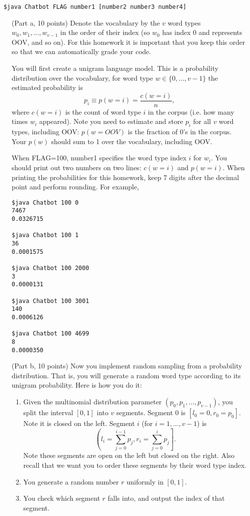 \documentclass{article}
\begin{document}
\texttt{
\$java Chatbot FLAG number1 [number2 number3 number4]
}


\begin{itemize}

\item[(Part a, 10 points)]
Denote the vocabulary by the $v$ word types $w_0, w_1, \ldots, w_{v-1}$ in the order of their index (so $w_0$ has index 0 and represents OOV, and so on). 
For this homework it is important that you keep this order so that we can automatically grade your code.

You will first create a unigram language model.
This is a probability distribution over the vocabulary, for word type $w \in \{0, \ldots, v-1\}$ the estimated probability is
$$p_i \equiv p(w=i) = \frac{c(w=i)}{n},$$
where $c(w=i)$ is the count of word type $i$ in the corpus (i.e. how many times $w_i$ appeared).
Note you need to estimate and store $p_i$ for  all $v$ word types, including OOV:
$p(w=OOV)$ is the fraction of 0's in the corpus.
Your $p(w)$ should sum to 1 over the vocabulary, including OOV.

When FLAG=100, number1 specifies the word type index $i$ for $w_i$.  You should print out two numbers on two lines: $c(w=i)$ and $p(w=i)$.
When printing the probabilities for this homework, keep 7 digits after the decimal point and perform rounding.
For example,
\begin{verbatim}
$java Chatbot 100 0
7467
0.0326715

$java Chatbot 100 1
36
0.0001575

$java Chatbot 100 2000
3
0.0000131

$java Chatbot 100 3001
140
0.0006126

$java Chatbot 100 4699
8
0.0000350
\end{verbatim}

\item[(Part b, 10 points)]
Now you implement random sampling from a probability distribution.
That is, you will generate a random word type according to its unigram probability.
Here is how you do it: 
\begin{enumerate}
\item Given the multinomial distribution parameter $(p_0, p_1, \ldots, p_{v-1})$, you split the interval $[0,1]$ into $v$ segments.
Segment 0 is $[l_0=0, r_0=p_0]$.  Note it is closed on the left.
Segment $i$ (for $i=1, \ldots, v-1$) is $$\left(l_i=\sum_{j=0}^{i-1} p_j, r_i= \sum_{j=0}^{i} p_j\right].$$
Note these segments are open on the left but closed on the right.
Also recall that we want you to order these segments by their word type index. 
\item You generate a random number $r$ uniformly in $[0,1]$.
\item You check which segment $r$ falls into, and output the index of that segment.
\end{enumerate}


\end{itemize}
\end{document}
